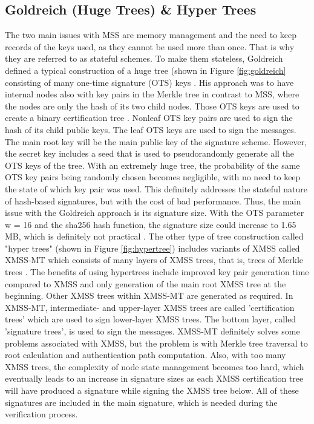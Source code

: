 \subsection{Goldreich (Huge Trees) \& Hyper Trees}
The two main issues with MSS are memory management and the need to keep records of the keys used, as they cannot be used more than once.
That is why they are referred to as stateful schemes.
To make them stateless, Goldreich defined a typical construction of a huge tree (shown in Figure \ref{fig:goldreich} consisting of
many one-time signature (OTS) keys \cite{goldreichFoundationsCryptography2003}.
 His approach was to have internal nodes also with key pairs in the Merkle tree in contrast to MSS, where the nodes are only the hash of its two child nodes.
 Those OTS keys are used to create a binary certification tree \cite{bernsteinSPHINCSPracticalStateless2015}.
 Nonleaf OTS key pairs are used to sign the hash of its child public keys.
 The leaf OTS keys are used to sign the messages.
 The main root key will be the main public key of the signature scheme.
However, the secret key includes a seed that is used to pseudorandomly generate all the OTS keys of the tree.
 With an extremely huge tree, the probability of the same OTS key pairs being randomly chosen becomes negligible, with
no need to keep the state of which key pair was used.
This definitely addresses the stateful nature of hash-based signatures, but with the cost of bad performance.
 Thus, the main issue with the Goldreich approach is its signature size.
 With the OTS parameter w = 16 and the sha256 hash function, 
 the signature size could increase to 1.65 MB, 
 which is definitely not practical \cite{castelnoviGraftingTreesFault2018a}.
The other type of tree construction called "hyper trees" (shown in Figure \ref{fig:hypertree}) includes variants of XMSS called XMSS-MT
which consists of many layers of XMSS trees,
that is, trees of Merkle trees \cite{hulsingHashbasedSignaturesOutlinea}.
The benefits of using hypertrees include improved key pair generation time compared to XMSS and
only generation of the main root XMSS tree at the beginning.
Other XMSS trees within XMSS-MT are generated as required.
In XMSS-MT, intermediate- and upper-layer XMSS trees are called 'certification trees' which are used to sign lower-layer XMSS trees.
The bottom layer, called 'signature trees', is used to sign the messages.
XMSS-MT definitely solves some problems associated with XMSS, but the problem is with Merkle tree traversal to root calculation and authentication path computation.
Also, with too many XMSS trees, the complexity of node state management becomes too hard,
which eventually leads to an increase in signature sizes as each XMSS certification tree will have produced a signature
while signing the XMSS tree below.
All of these signatures are included in the main signature, which is needed during the verification process.

